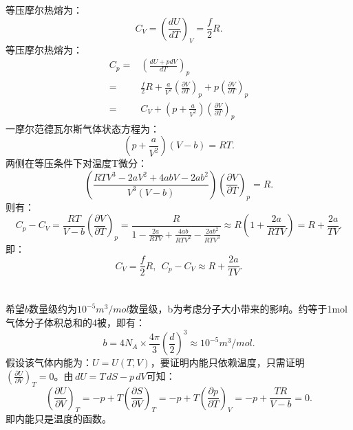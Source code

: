 \documentclass[a4paper,12pt]{article}
\begin{document}
\section{}
等压摩尔热熔为：
\begin{equation*}
	C_V = \left( \frac{dU}{dT} \right)_V = \frac{f}{2}R.
\end{equation*}
等压摩尔热熔为：
\begin{equation*}
\begin{aligned}
	C_p =& \left( \frac{dU + pdV}{dT} \right)_p \\
	=& \frac{f}{2}R + \frac{a}{V^2}\left( \frac{\partial V}{\partial T} \right)_p + p\left( \frac{\partial V}{\partial T} \right)_p \\
	=& C_V + \left( p + \frac{a}{V^2} \right) \left( \frac{\partial V}{\partial T} \right)_p
\end{aligned} 
\end{equation*}
一摩尔范德瓦尔斯气体状态方程为：
\begin{equation*}
	\left( p + \frac{a}{V^2} \right)(V - b) = RT.
\end{equation*}
两侧在等压条件下对温度T微分：
\begin{equation*}
	\left( \frac{RTV^3 - 2aV^2 + 4abV - 2ab^2}{V^3(V-b)} \right) \left( \frac{\partial V}{\partial T} \right)_p = R.
\end{equation*}
则有：
\begin{equation*}
	C_p - C_V = \frac{RT}{V-b}\left( \frac{\partial V}{\partial T} \right)_p = \frac{R}{1 - \frac{2a}{RTV} + \frac{4ab}{RTV^2} - \frac{2ab^2}{RTV^3}} \approx R\left( 1 + \frac{2a}{RTV} \right) = R + \frac{2a}{TV}.
\end{equation*}
即：
\begin{equation*}
	C_V = \frac{f}{2}R, ~~ C_p - C_V \approx R + \frac{2a}{TV}.
\end{equation*}


\section{}
希望$b$数量级约为$10^{-5}m^3/mol$数量级，b为考虑分子大小带来的影响。约等于1mol气体分子体积总和的4被，即有：
\begin{equation*}
	b = 4N_A \times \frac{4\pi}{3} \left( \frac{d}{2} \right)^3 \approx 10^{-5} m^3/mol.
\end{equation*}
假设该气体内能为：$U = U(T,V)$，要证明内能只依赖温度，只需证明$\left( \frac{\partial U}{\partial V} \right)_T = 0$。由$\,dU = T\,dS - p\,dV$可知：
\begin{equation*}
	\left( \frac{\partial U}{\partial V} \right)_T = -p + T \left( \frac{\partial S}{\partial V} \right)_T = -p + T\left( \frac{\partial p}{\partial T} \right)_V = -p + \frac{TR}{V-b} = 0.
\end{equation*}
即内能只是温度的函数。
\end{document}
